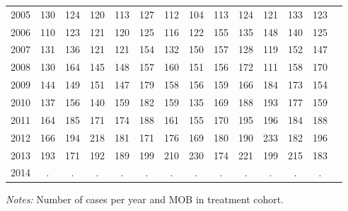 \begin{table}[H]
\begin{threeparttable}
{\begin{tabular}{l*{13}{c}}
2005        &         130&         124&         120&         113&         127&         112&         104&         113&         124&         121&         133&         123\\
2006        &         110&         123&         121&         120&         125&         116&         122&         155&         135&         148&         140&         125\\
2007        &         131&         136&         121&         121&         154&         132&         150&         157&         128&         119&         152&         147\\
2008        &         130&         164&         145&         148&         157&         160&         151&         156&         172&         111&         158&         170\\
2009        &         144&         149&         151&         147&         179&         158&         156&         159&         166&         184&         173&         154\\
2010        &         137&         156&         140&         159&         182&         159&         135&         169&         188&         193&         177&         159\\
2011        &         164&         185&         171&         174&         188&         161&         155&         170&         195&         196&         184&         188\\
2012        &         166&         194&         218&         181&         171&         176&         169&         180&         190&         233&         182&         196\\
2013        &         193&         171&         192&         189&         199&         210&         230&         174&         221&         199&         215&         183\\
2014        &           .&           .&           .&           .&           .&           .&           .&           .&           .&           .&           .&           .\\
 \bottomrule \end{tabular} } \begin{tablenotes} \item \scriptsize \emph{Notes:} Number of cases per year and MOB in treatment cohort. \end{tablenotes} \end{threeparttable} \end{table} 
